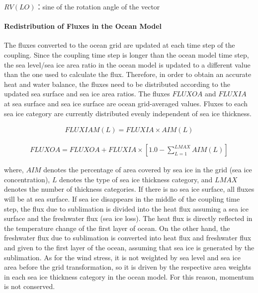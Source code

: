 \(RV(LO)\)：sine of the rotation angle of the vector

\hypertarget{redistribution-of-fluxes-in-the-ocean-model}{%
\paragraph{Redistribution of Fluxes in the Ocean
Model}\label{redistribution-of-fluxes-in-the-ocean-model}}

The fluxes converted to the ocean grid are updated at each time step of
the coupling. Since the coupling time step is longer than the ocean
model time step, the sea level/sea ice area ratio in the ocean model is
updated to a different value than the one used to calculate the flux.
Therefore, in order to obtain an accurate heat and water balance, the
fluxes need to be distributed according to the updated sea surface and
sea ice area ratios. The fluxes \(FLUXOA\) and \(FLUXIA\) at sea surface
and sea ice surface are ocean grid-averaged values. Fluxes to each sea
ice category are currently distributed evenly independent of sea ice
thickness.

\begin{eqnarray} FLUXIAM(L)=FLUXIA \times AIM(L)\end{eqnarray}

\begin{eqnarray} FLUXOA=FLUXOA+FLUXIA \times [1.0-\sum_{L=1}^{LMAX}AIM(L)]\end{eqnarray}

where, \(AIM\) denotes the percentage of area covered by sea ice in the
grid (sea ice concentration), \(L\) denotes the type of sea ice
thickness category, and \(LMAX\) denotes the number of thickness
categories. If there is no sea ice surface, all fluxes will be at sea
surface. If sea ice disappears in the middle of the coupling time step,
the flux due to sublimation is divided into the heat flux assuming a sea
ice surface and the freshwater flux (sea ice loss). The heat flux is
directly reflected in the temperature change of the first layer of
ocean. On the other hand, the freshwater flux due to sublimation is
converted into heat flux and freshwater flux and given to the first
layer of the ocean, assuming that sea ice is generated by the
sublimation. As for the wind stress, it is not weighted by sea level and
sea ice area before the grid transformation, so it is driven by the
respective area weights in each sea ice thickness category in the ocean
model. For this reason, momentum is not conserved.

